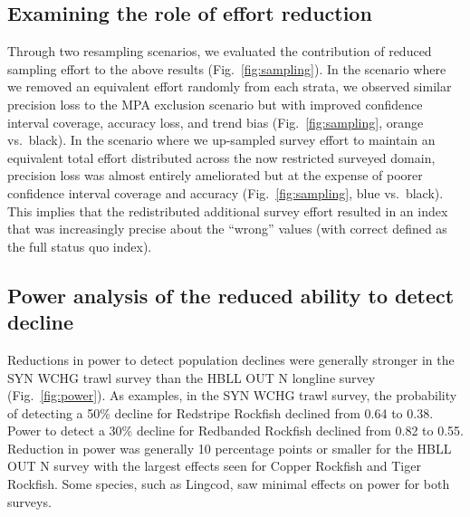 \documentclass[12pt]{article}
\begin{document}
\subsection*{Examining the role of effort reduction}

Through two resampling scenarios, we evaluated the contribution of reduced sampling effort to the above results (Fig.~\ref{fig:sampling}).
In the scenario where we removed an equivalent effort randomly from each strata, we observed similar precision loss to the MPA exclusion scenario but with improved confidence interval coverage, accuracy loss, and trend bias (Fig.~\ref{fig:sampling}, orange vs.\ black).
In the scenario where we up-sampled survey effort to maintain an equivalent total effort distributed across the now restricted surveyed domain,
precision loss was almost entirely ameliorated but at the expense of poorer confidence interval coverage and accuracy (Fig.~\ref{fig:sampling}, blue vs.\ black).
This implies that the redistributed additional survey effort resulted in an index that was increasingly precise about the ``wrong'' values (with correct defined as the full status quo index).

\subsection*{Power analysis of the reduced ability to detect decline}

Reductions in power to detect population declines were generally stronger in the SYN WCHG trawl survey than the HBLL OUT N longline survey (Fig.~\ref{fig:power}).
As examples, in the SYN WCHG trawl survey, the probability of detecting a 50\% decline for Redstripe Rockfish declined from 0.64 to 0.38.
Power to detect a 30\% decline for Redbanded Rockfish declined from 0.82 to 0.55.
Reduction in power was generally 10 percentage points or smaller for the HBLL OUT N survey with the largest effects seen for Copper Rockfish and Tiger Rockfish.
Some species, such as Lingcod, saw minimal effects on power for both surveys.
\end{document}
